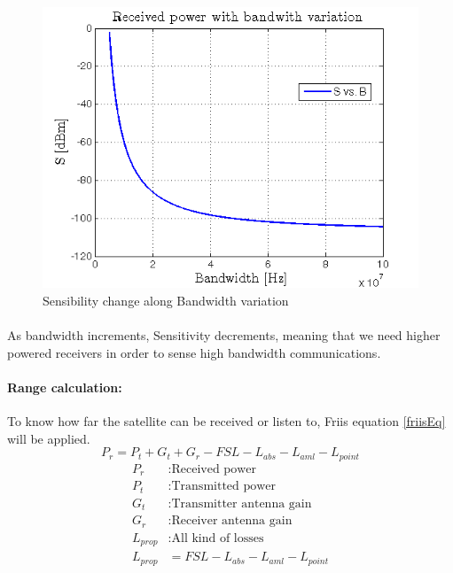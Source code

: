 \begin{figure}[h]
	\includegraphics[scale=0.9]{./sections/images/SvsB}
	\centering
	\caption{Sensibility change along Bandwidth variation}
	\label{SvsB}
\end{figure}

\paragraph{} As bandwidth increments, Sensitivity decrements, meaning that we need higher powered receivers in order to sense high bandwidth communications.
\paragraph{Range calculation:} To know how far the satellite can be received or listen to, Friis equation \ref{friisEq} will be applied. 
\begin{equation}
	P_r=P_t+G_t+G_r -FSL -L_{abs}-L_{aml}-L_{point}
	\label{friisEq}
\end{equation}
\begin{align*}
		P_r&:\text{Received power}\\
		P_t&:\text{Transmitted power}\\
		G_t&:\text{Transmitter antenna gain}\\
		G_r&:\text{Receiver antenna gain}\\
		L_{prop}&:\text{All kind of losses}\\
		L_{prop}&=FSL -L_{abs}-L_{aml}-L_{point}  	
\end{align*}

